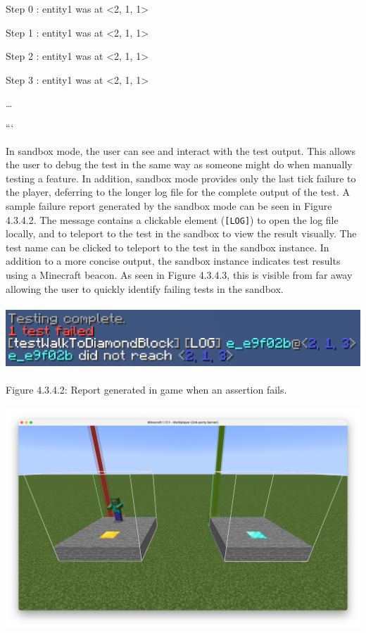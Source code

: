 \documentclass{article}
\def\code#1{\texttt{#1}}
\begin{document}
\begin{onehalfspacing}
Step 0 : entity1 was at \textless2, 1, 1\textgreater{}

Step 1 : entity1 was at \textless2, 1, 1\textgreater{}

Step 2 : entity1 was at \textless2, 1, 1\textgreater{}

Step 3 : entity1 was at \textless2, 1, 1\textgreater{}

\ldots{}

```

In sandbox mode, the user can see and interact with the test output.
This allows the user to debug the test in the same way as someone might
do when manually testing a feature. In addition, sandbox mode provides
only the last tick failure to the player, deferring to the longer log
file for the complete output of the test. A sample failure report
generated by the sandbox mode can be seen in Figure 4.3.4.2. The message
contains a clickable element (\code{{[}LOG{]}}) to open the log file locally,
and to teleport to the test in the sandbox to view the result visually.
The test name can be clicked to teleport to the test in the sandbox
instance. In addition to a more concise output, the sandbox instance
indicates test results using a Minecraft beacon. As seen in Figure
4.3.4.3, this is visible from far away allowing the user to quickly
identify failing tests in the sandbox.

\includegraphics[width=5.89071in,height=0.95353in]{media/media/image6.png}

Figure 4.3.4.2: Report generated in game when an assertion fails.

\includegraphics[width=5.89249in,height=3.31771in]{media/media/image3.png}


\end{onehalfspacing}
\end{document}
